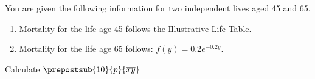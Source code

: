 You are given the following information for two independent lives aged 45 and 65.
\begin{enumerate}
  \item Mortality for the life age 45 follows the Illustrative Life Table.
  \item Mortality for the life age 65 follows: $f(y)=0.2e^{-0.2y}$.
\end{enumerate}
Calculate $\prepostsub{10}{p}{\overline{xy}}$
